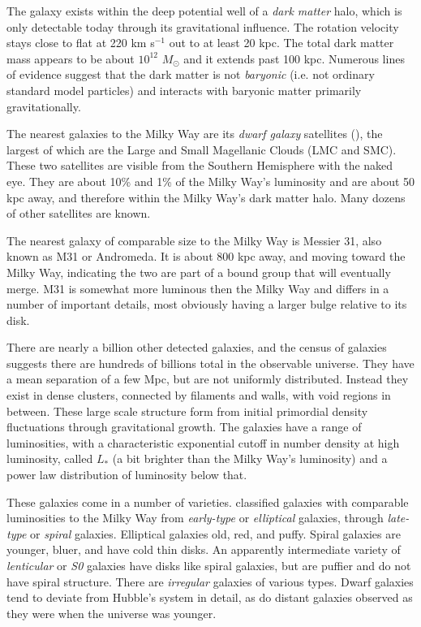 The galaxy exists within the deep potential well of a {\it dark
  matter} halo, which is only detectable today through its
gravitational influence. The rotation velocity stays close to flat at
220 km s$^{-1}$ out to at least 20 kpc. The total dark matter mass
appears to be about $10^{12}$ $M_\odot$ and it extends past 100
kpc. Numerous lines of evidence suggest that the dark matter is not
{\it baryonic} (i.e. not ordinary standard model particles) and
interacts with baryonic matter primarily gravitationally.

The nearest galaxies to the Milky Way are its {\it dwarf galaxy}
satellites (\citealt{mcconnachie12a}), the largest of which are the
Large and Small Magellanic Clouds (LMC and SMC). These two satellites
are visible from the Southern Hemisphere with the naked eye. They are
about 10\% and 1\% of the Milky Way's luminosity and are about 50 kpc
away, and therefore within the Milky Way's dark matter halo. Many
dozens of other satellites are known.

The nearest galaxy of comparable size to the Milky Way is Messier 31,
also known as M31 or Andromeda. It is about 800 kpc away, and moving
toward the Milky Way, indicating the two are part of a bound group
that will eventually merge. M31 is somewhat more luminous then the
Milky Way and differs in a number of important details, most obviously
having a larger bulge relative to its disk.

There are nearly a billion other detected galaxies, and the census of
galaxies suggests there are hundreds of billions total in the
observable universe. They have a mean separation of a few Mpc, but are
not uniformly distributed. Instead they exist in dense clusters,
connected by filaments and walls, with void regions in between. These
large scale structure form from initial primordial density
fluctuations through gravitational growth. The galaxies have a range
of luminosities, with a characteristic exponential cutoff in number
density at high luminosity, called $L_\ast$ (a bit brighter than the
Milky Way's luminosity) and a power law distribution of luminosity
below that.

These galaxies come in a number of varieties. \citet{hubble36a}
classified galaxies with comparable luminosities to the Milky Way from
{\it early-type} or {\it elliptical} galaxies, through {\it late-type}
or {\it spiral} galaxies.  Elliptical galaxies old, red, and
puffy. Spiral galaxies are younger, bluer, and have cold thin
disks. An apparently intermediate variety of {\it lenticular} or {\it
S0} galaxies have disks like spiral galaxies, but are puffier and do
not have spiral structure. There are {\it irregular} galaxies of
various types. Dwarf galaxies tend to deviate from Hubble's system in
detail, as do distant galaxies observed as they were when the universe
was younger.

